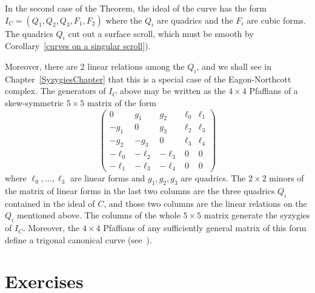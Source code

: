
\begin{fact}
In the second case of the Theorem, the ideal of the curve has the form $I_C = (Q_1, Q_2, Q_3, F_1, F_2)$ 
where the $Q_i$ are quadrics and the $F_i$ are cubic forms. The quadrics $Q_i$ cut out a surface scroll, which
must be smooth by Corollary~\ref{curves on a singular scroll}).

Moreover, there are 2 linear relations among the
$Q_i$, and we shall see in Chapter~\ref{SyzygiesChapter} that this is a special case of the Eagon-Northcott
complex. The generators of $I_C$ above may be written as the $4\times 4$ Pfaffians
of a skew-symmetric $5\times 5$ matrix of the form
$$
\begin{pmatrix}
0&g_1&g_2&\ell_0&\ell_1\\
-g_1&0&g_3&\ell_2&\ell_3\\
-g_2&-g_3&0 &\ell_3&\ell_4\\
-\ell_0&-\ell_2&-\ell_3&0&0\\
-\ell_1&-\ell_3&-\ell_4&0&0
\end{pmatrix}
$$
where $\ell_0,\dots,\ell_3$ are linear forms and $g_1, g_2, g_3$ are quadrics. The
 $2\times 2$
minors of the matrix of linear forms in the last two columns are the three quadrics $Q_i$ contained in the ideal
of $C$, and those two columns are the linear relations on the $Q_i$ mentioned above.
The columns of the whole $5\times 5$ matrix generate the syzygies of $I_C$. Moreover, the
$4\times 4$ Pfaffians of any sufficiently general matrix of this form define a trigonal canonical curve
(see~\cite{MR453723}).
\end{fact}



\section{Exercises}

